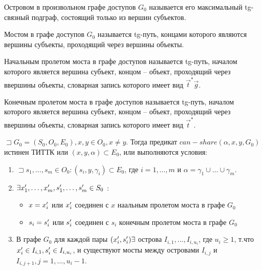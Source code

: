 \begin{defs}[Остров]
	Островом в произвольном графе доступов $G_0$ называется его максимальный tg-связный подграф, состоящий только из вершин субъектов.
\end{defs}

\begin{defs}[Мост]
	Мостом в графе доступов $G_0$ называется tg-путь, концами которого являются вершины субъекты, проходящий через вершины объекты.
\end{defs}

\begin{defs}
	Начальным пролетом моста в графе доступов называется tg-путь, началом которого является вершина субъект, концом -- объект, проходящий через ввершины объекты, словарная запись которого имеет вид
	 $ \overrightarrow{t}^* \overrightarrow{g} $.
\end{defs}

\begin{defs}
	Конечным пролетом моста в графе доступов называется tg-путь, началом которого является вершина субъект, концом -- объект, проходящий через ввершины объекты, словарная запись которого имеет вид
	$\overrightarrow{t}^*$.
\end{defs}

\begin{proofs}
	$\sqsupset  G_0 = (S_0, O_0, E_0), x,y \in O_0, x \neq y$. Тогда предикат $can-share(\alpha, x, y, G_0)$
	истинен ТИТТК или $(x, y, \alpha ) \subset E_0$, или выполняются условия:
	\begin{enumerate}
		\item $ \sqsupset s_1, \ldots, s_m \in O_0 : (s_i, y, \gamma_i) \subset E_0 $, где
		$ i = 1, \ldots, m $ и $ \alpha = \gamma_1 \cup \ldots \cup \gamma_m $.
		\item $ \exists x_1^{\prime}, \ldots, x_m^{\prime}, s_1^{\prime}, \ldots, s_m^{\prime} \in S_0$ :
			\begin{itemize}
				\item $x = x_i^{\prime}$ или $x_i^{\prime}$ соединен с $x$ наальным пролетом моста в графе $G_0$
				\item $s_i = s_i^{\prime}$ или $s_i^{\prime}$ соединен с $s_i$ конечным пролетом моста в графе $G_0$
			\end{itemize}
		\item В графе $G_0$ для каждой пары $(x_i^{\prime}, s_i^{\prime}) \exists $ острова $I_{i,1}, \ldots, I_{i, u_{i}}$, где $u_i \geqslant 1$, т.что
		$x_i^{\prime} \in I_{i,1}, s_i^{\prime} \in I_{i, u_{i}}$, и существуют мосты между островами $I_{i,j}$ и $I_{i, j+1}, j = 1, \ldots, u_i - 1$.
	\end{enumerate}
\end{proofs}

